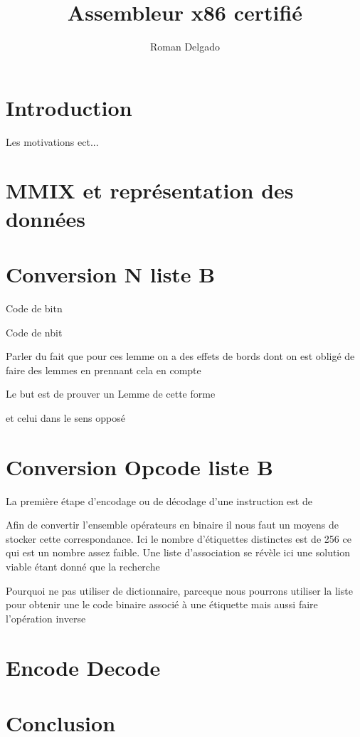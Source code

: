 \documentclass {article}
\title{Assembleur x86 certifié}
\author{Roman Delgado}
\date{}
\newcommand{\codefrom}[3]
           {}
\theoremstyle{definition}
\theoremstyle{remark}
\begin{document}
\maketitle



\vfill
\setcounter{tocdepth}{2}
\tableofcontents
\vfill


\section{Introduction}

Les motivations ect...

\section{MMIX et représentation des données}


\section{Conversion N liste B}

Code de bitn
\codefrom{src}{binary}{bitn}

Code de nbit
\codefrom{src}{binary}{nbit}


Parler du fait que pour ces lemme on a des effets de bords dont on est obligé
de faire des lemmes en prennant cela en compte 

Le but est de prouver un Lemme de cette forme
\codefrom{src}{binary}{nbitn}

et celui dans le sens opposé 
\codefrom{src}{binary}{bitnbit}






\section{Conversion Opcode liste B}


La première étape d'encodage ou de décodage d'une instruction est de


Afin de convertir l'ensemble opérateurs en binaire il nous faut
un moyens de stocker cette correspondance.
Ici le nombre d'étiquettes distinctes est de 256 ce qui est un nombre
assez faible. Une liste d'association se révèle ici une solution viable
étant donné que la recherche



Pourquoi ne pas utiliser de dictionnaire, parceque nous pourrons utiliser
la liste pour obtenir une le code binaire associé à une étiquette mais aussi faire
l'opération inverse


\section{Encode Decode}

\section{Conclusion}
\end{document}

